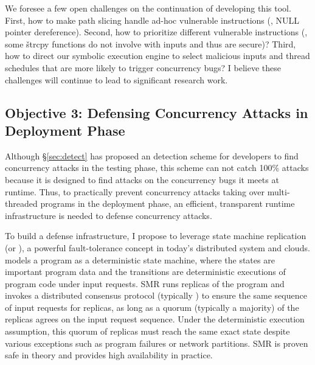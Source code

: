  We foresee a few open challenges on the 
continuation of developing this tool. First, how to make path slicing handle 
ad-hoc vulnerable instructions (\eg, NULL pointer dereference). Second, how to 
prioritize different vulnerable instructions (\eg, some \v{strcpy} functions do 
not involve with inputs and thus are secure)? Third, how to direct our symbolic 
execution engine to select malicious inputs and thread schedules that are more 
likely to trigger concurrency bugs? I believe these challenges will continue to 
lead to significant research work.

\vspace{-.15in}\subsection{Objective 3: Defensing Concurrency Attacks in 
Deployment Phase} 
\label{sec:defense}\vspace{-.075in}

Although \S\ref{sec:detect} has proposed an detection scheme for developers to 
find concurrency attacks in the testing phase, this scheme can not catch 100\% 
attacks because it is designed to find attacks on the concurrency bugs it meets 
at runtime. Thus, to practically prevent concurrency attacks taking over 
multi-threaded programs in the deployment phase, an efficient, transparent 
runtime infrastructure is needed to defense concurrency attacks.

To build a defense infrastructure, I propose to leverage state machine 
replication (or \smr), a powerful fault-tolerance concept in today's 
distributed system and clouds. \smr models a program as a deterministic
state machine, where the states are important program data and the transitions 
are deterministic executions of program code under input requests. SMR runs 
replicas of the program and invokes a distributed consensus protocol 
(typically \paxos) to ensure the same sequence of input requests for replicas, 
as long as a quorum (typically a majority) of the replicas agrees on the input 
request sequence. Under the deterministic execution assumption, this quorum of 
replicas must reach the same exact state despite various exceptions such as 
program failures or network partitions. SMR is proven safe in theory and 
provides high availability in practice.

